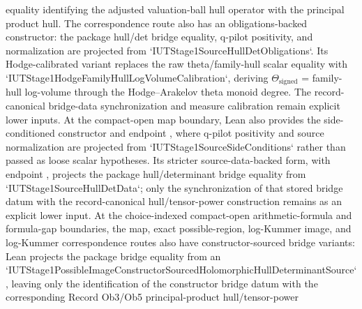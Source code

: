 \begin{proposition}
  equality identifying the adjusted valuation-ball hull operator with the
  principal product hull.  The correspondence route
  also has an obligations-backed constructor: the package hull/det bridge
  equality, q-pilot positivity, and normalization are projected from
  `IUTStage1SourceHullDetObligations`.  Its Hodge-calibrated variant replaces
  the raw theta/family-hull scalar equality with
  `IUTStage1HodgeFamilyHullLogVolumeCalibration`, deriving
  \(\Theta_{\mathrm{signed}}\) = family-hull log-volume through the
  Hodge--Arakelov theta monoid degree.  The record-canonical bridge-data
  synchronization and measure calibration remain explicit lower inputs.  At
  the compact-open map boundary, Lean also provides the side-conditioned
  constructor
  and endpoint
  ,
  where q-pilot positivity and source normalization are projected from
  `IUTStage1SourceSideConditions` rather than passed as loose scalar
  hypotheses.  Its stricter source-data-backed form,
  with endpoint
  ,
  projects the package hull/determinant bridge equality from
  `IUTStage1SourceHullDetData`; only the synchronization of that stored bridge
  datum with the record-canonical hull/tensor-power construction remains as an
  explicit lower input.  At the choice-indexed compact-open arithmetic-formula
  and formula-gap boundaries, the map, exact possible-region, log-Kummer image,
  and log-Kummer correspondence routes also have constructor-sourced bridge
  variants: Lean projects the package bridge equality from an
  `IUTStage1PossibleImageConstructorSourcedHolomorphicHullDeterminantSource`,
  leaving only the identification of the constructor bridge datum with the
  corresponding Record Ob3/Ob5 principal-product hull/tensor-power

\end{proposition}
